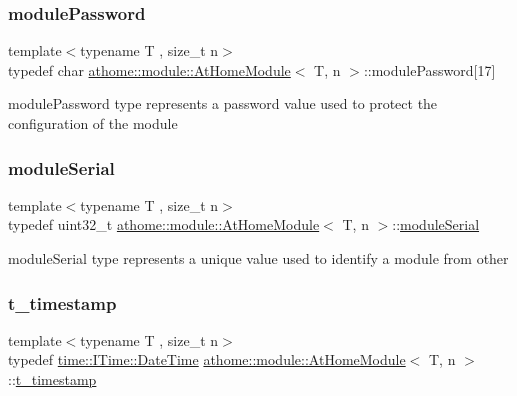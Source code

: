 \subsubsection{\texorpdfstring{module\+Password}{modulePassword}}
{\footnotesize\ttfamily template$<$typename T , size\+\_\+t n$>$ \\
typedef char \mbox{\hyperlink{classathome_1_1module_1_1_at_home_module}{athome\+::module\+::\+At\+Home\+Module}}$<$ T, n $>$\+::module\+Password\mbox{[}17\mbox{]}}

{\ttfamily module\+Password} type represents a password value used to protect the configuration of the module \mbox{\label{classathome_1_1module_1_1_at_home_module_aaa31c8eddb689010ef59deba4e1463c6}} 
\subsubsection{\texorpdfstring{module\+Serial}{moduleSerial}}
{\footnotesize\ttfamily template$<$typename T , size\+\_\+t n$>$ \\
typedef uint32\+\_\+t \mbox{\hyperlink{classathome_1_1module_1_1_at_home_module}{athome\+::module\+::\+At\+Home\+Module}}$<$ T, n $>$\+::\mbox{\hyperlink{classathome_1_1module_1_1_at_home_module_aaa31c8eddb689010ef59deba4e1463c6}{module\+Serial}}}

{\ttfamily module\+Serial} type represents a unique value used to identify a module from other \mbox{\label{classathome_1_1module_1_1_at_home_module_a74611fcc9d7580bded68899a4fd9c930}} 
\subsubsection{\texorpdfstring{t\+\_\+timestamp}{t\_timestamp}}
{\footnotesize\ttfamily template$<$typename T , size\+\_\+t n$>$ \\
typedef \mbox{\hyperlink{structathome_1_1time_1_1_i_time_1_1_date_time}{time\+::\+I\+Time\+::\+Date\+Time}} \mbox{\hyperlink{classathome_1_1module_1_1_at_home_module}{athome\+::module\+::\+At\+Home\+Module}}$<$ T, n $>$\+::\mbox{\hyperlink{classathome_1_1module_1_1_at_home_module_a74611fcc9d7580bded68899a4fd9c930}{t\+\_\+timestamp}}}

